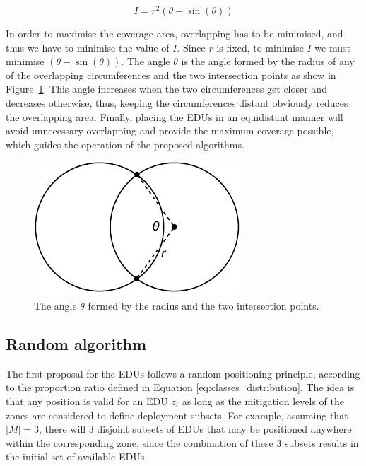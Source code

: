 \begin{refsection}
\begin{equation}
  I = r^2(\theta - \sin(\theta))
  \label{eq:overlapping_area}
\end{equation}

In order to maximise the coverage area, overlapping has to be minimised, and thus we have to minimise the value of $I$. Since $r$ is fixed, to minimise $I$ we must minimise $(\theta - \sin(\theta))$. The angle $\theta$ is the angle formed by the radius of any of the overlapping circumferences and the two intersection points as show in Figure~\ref{fig:circle_intersection}. This angle increases when the two circumferences get closer and decreases otherwise, thus, keeping the circumferences distant obviously reduces the overlapping area. Finally, placing the EDUs in an equidistant manner will avoid unnecessary overlapping and provide the maximum coverage possible, which guides the operation of the proposed algorithms.

\begin{figure}[htbp]
  \centering
  \includegraphics{Chapters/2-EDUs/images/circumferences_overlapping.pdf}
  \caption{The angle $\theta$ formed by the radius and the two intersection points.}\label{fig:circle_intersection}
\end{figure}

\subsection {Random algorithm}

The first proposal for the EDUs follows a random positioning principle, according to the proportion ratio defined in Equation \ref{eq:classes_distribution}. The idea is that any position is valid for an EDU $z_i$ as long as the mitigation levels of the zones are considered to define deployment subsets. For example, assuming that $|M|=3$, there will 3 disjoint subsets of EDUs that may be positioned anywhere within the corresponding zone, since the combination of these 3 subsets results in the initial set of available EDUs.


\end{refsection}
